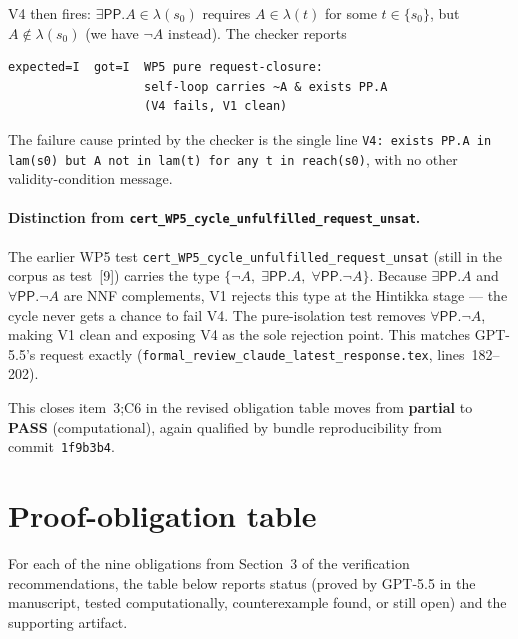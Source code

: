 \documentclass[11pt]{article}
\newcommand{\PP}{\mathsf{PP}}
\newcommand{\PASS}{\textcolor{black!70!green}{\textbf{PASS}}}
\newcommand{\PARTIAL}{\textcolor{black!60!orange}{\textbf{partial}}}
\begin{document}
V4 then fires: \(\exists\PP.A \in \lambda(s_0)\) requires
\(A \in \lambda(t)\) for some \(t \in \{s_0\}\), but
\(A \notin \lambda(s_0)\) (we have \(\neg A\) instead).  The
checker reports
\begin{lstlisting}
expected=I  got=I  WP5 pure request-closure:
                   self-loop carries ~A & exists PP.A
                   (V4 fails, V1 clean)
\end{lstlisting}
The failure cause printed by the checker is the single line
\texttt{V4: exists PP.A in lam(s0) but A not in lam(t)
for any t in reach(s0)}, with no other validity-condition message.

\paragraph{Distinction from
\texttt{cert\_WP5\_cycle\_unfulfilled\_request\_unsat}.}  The
earlier WP5 test
\texttt{cert\_WP5\_cycle\_unfulfilled\_request\_unsat} (still in
the corpus as test~[9]) carries the type
\(\{\neg A,\; \exists\PP.A,\; \forall\PP.\neg A\}\).  Because
\(\exists\PP.A\) and \(\forall\PP.\neg A\) are NNF complements,
V1 rejects this type at the Hintikka stage --- the cycle never
gets a chance to fail V4.  The pure-isolation test removes
\(\forall\PP.\neg A\), making V1 clean and exposing V4 as the
sole rejection point.  This matches GPT-5.5's request exactly
(\texttt{formal\_review\_claude\_latest\_response.tex},
lines~182--202).

This closes item~3;\@ C6 in the revised obligation table moves
from \PARTIAL{} to \PASS{} (computational), again qualified by
bundle reproducibility from commit~\texttt{1f9b3b4}.

\section{Proof-obligation table}

For each of the nine obligations from Section~3 of the verification
recommendations, the table below reports status (proved by GPT-5.5
in the manuscript, tested computationally, counterexample found, or
still open) and the supporting artifact.
\end{document}
